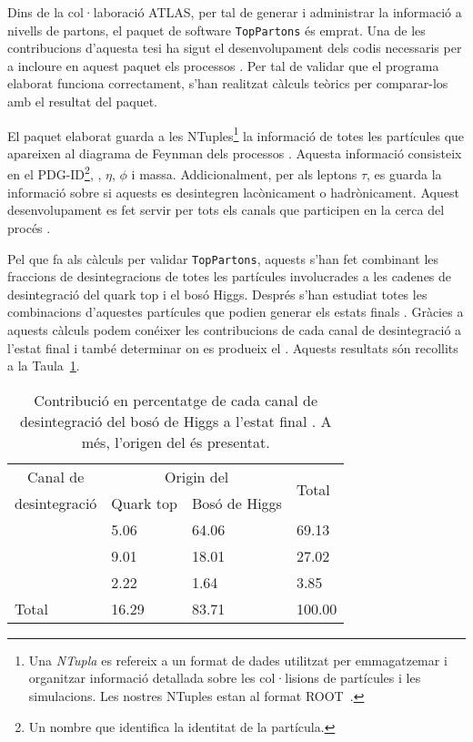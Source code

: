 Dins de la col·laboració ATLAS, per tal de generar i administrar la informació a nivells de partons, el
paquet de software \texttt{TopPartons} és emprat. Una de les contribucions %
d'aquesta tesi ha sigut el desenvolupament dels codis necessaris per a incloure en aquest paquet els processos \tHq.
Per tal de validar que el programa elaborat funciona correctament, s'han realitzat càlculs teòrics per comparar-los amb el resultat
del paquet.

El paquet elaborat guarda a les NTuples\footnote{Una \textit{NTupla} es refereix a un format de dades utilitzat
per emmagatzemar i organitzar informació detallada sobre les col·lisions de partícules i les simulacions. 
Les nostres NTuples estan al format ROOT~\cite{Brun:1997pa}.}
la informació de totes les partícules que apareixen al diagrama de Feynman dels processos \tHq.
Aquesta informació consisteix en el PDG-ID\footnote{Un nombre que identifica la identitat de la partícula.}, \pT, $\eta$, $\phi$ i massa. Addicionalment, per als leptons $\tau$,
es guarda la informació sobre si aquests es desintegren lacònicament o hadrònicament.
Aquest desenvolupament es fet servir per tots els canals que participen en la cerca del procés \tHq.

Pel que fa als càlculs per validar \texttt{TopPartons}, aquests s'han fet combinant les fraccions de desintegracions
de totes les partícules involucrades a les cadenes de desintegració del quark top i el bosó Higgs. Després s'han estudiat
totes les combinacions d'aquestes partícules que podien generar els estats finals \dileptau. Gràcies a aquests càlculs podem
conéixer les contribucions de cada canal de desintegració a l'estat final i també determinar on es produeix el \tauhad.
Aquests resultats són recollits a la Taula~\ref{tab:ResumChaptH:TruthSummary}.


\begin{table}[h]
\centering
\begin{adjustbox}{max width=0.95\textwidth}
\begin{tabular}{l|ll|l}
\toprule
       \multicolumn{1}{c|}{Canal de} 	& \multicolumn{2}{c|}{Origin del \tauhad} &    \multirow{2}{*}{Total}     \\ \cline{2-3}
      \multicolumn{1}{c|}{desintegració}  			& Quark  top      				& Bosó de Higgs       &   \\ \midrule
\Htautau 	& 5.06      					& 64.06        		      			& 69.13	\\
\HWW    	& 9.01         				& 18.01              				& 27.02 	\\
\HZZ    	& 2.22          				& 1.64               				& 3.85   	\\ 
\midrule
Total  	& 16.29           				& 83.71              				& 100.00 	\\
\bottomrule
\end{tabular}
\end{adjustbox}
\caption{Contribució en percentatge de cada canal de desintegració del bosó de Higgs a l'estat final \dileptau. 
A més, l'origen del \tauhad és presentat.}
\label{tab:ResumChaptH:TruthSummary}
\end{table}

